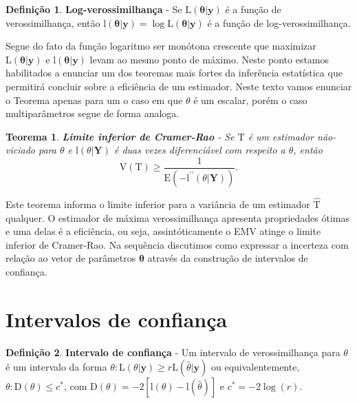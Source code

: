 \documentclass[
  9pt,
  a5paper,
]{book}
\newtheorem{theorem}{Teorema}[chapter]
\theoremstyle{definition}
\newtheorem{definition}{Definição}[chapter]
\theoremstyle{definition}
\theoremstyle{definition}
\theoremstyle{definition}
\theoremstyle{remark}
\begin{document}
\begin{definition}
\protect\hypertarget{def:unnamed-chunk-14}{}\label{def:unnamed-chunk-14}\textbf{Log-verossimilhança} - Se \(\mathrm{L}(\boldsymbol{\theta}|\mathbf{y})\) é a função de verossimilhança, então \(\mathrm{l}(\boldsymbol{\theta}|\mathbf{y}) = \log \mathrm{L}(\boldsymbol{\theta}|\mathbf{y})\) é a função de log-verossimilhança.
\end{definition}

Segue do fato da função logaritmo ser monótona crescente que maximizar \(\mathrm{L}(\boldsymbol{\theta}|\mathbf{y})\) e \(\mathrm{l}(\boldsymbol{\theta}|\mathbf{y})\)
levam ao mesmo ponto de máximo. Neste ponto estamos habilitados a enunciar um dos teoremas mais fortes da inferência estatística que permitirá concluir sobre a eficiência de um estimador. Neste texto vamos enunciar o Teorema apenas para um o caso em que
\(\theta\) é um escalar, porém o caso multiparâmetros segue de forma analoga.

\begin{theorem}
\protect\hypertarget{thm:cramer}{}\label{thm:cramer}\textbf{Limite inferior de Cramer-Rao} - Se \(\mathrm{T}\) é um estimador não-viciado para \(\theta\) e \(\mathrm{l}(\theta|\mathbf{Y})\) é duas vezes diferenciável com respeito a \(\theta\), então
\[ \mathrm{V}(\mathrm{T}) \ge \frac{1}{\mathrm{E}( - \mathrm{l}^{\prime \prime}(\theta| \mathbf{Y}) )} . \]
\end{theorem}

Este teorema informa o limite inferior para a variância de um estimador \(\hat{\mathrm{T}}\) qualquer. O estimador de máxima verossimilhança apresenta propriedades ótimas e uma delas é a eficiência, ou seja, assintóticamente o EMV atinge o limite inferior de Cramer-Rao.
Na sequência discutimos como expressar a incerteza com relação ao vetor de parâmetros \(\boldsymbol{\theta}\) através da construção de intervalos de confiança.

\hypertarget{intervalos-de-confianuxe7a}{%
\section{Intervalos de confiança}\label{intervalos-de-confianuxe7a}}

\begin{definition}
\protect\hypertarget{def:unnamed-chunk-15}{}\label{def:unnamed-chunk-15}\textbf{Intervalo de confiança} - Um intervalo de verossimilhança para \(\theta\)
é um intervalo da forma \(\theta: \mathrm{L}(\theta|\mathbf{y}) \ge r \mathrm{L}(\hat{\theta}|\mathbf{y})\) ou equivalentemente, \(\theta: \mathrm{D}(\theta) \leq c^*\), com \(\mathrm{D}(\theta) = -2[\mathrm{l}(\theta)-\mathrm{l}(\hat{\theta})]\) e \(c^* = - 2 \log(r)\).
\end{definition}
\end{document}
